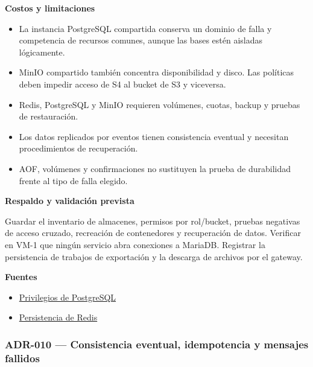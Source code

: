 \par\medskip\noindent\textbf{Costos y limitaciones}\par\nobreak\smallskip

\begin{itemize}[leftmargin=1.5em,itemsep=3pt]
\item La instancia PostgreSQL compartida conserva un dominio de falla y competencia de recursos comunes, aunque las bases estén aisladas lógicamente.
\item MinIO compartido también concentra disponibilidad y disco. Las políticas deben impedir acceso de S4 al bucket de S3 y viceversa.
\item Redis, PostgreSQL y MinIO requieren volúmenes, cuotas, backup y pruebas de restauración.
\item Los datos replicados por eventos tienen consistencia eventual y necesitan procedimientos de recuperación.
\item AOF, volúmenes y confirmaciones no sustituyen la prueba de durabilidad frente al tipo de falla elegido.
\end{itemize}

\par\medskip\noindent\textbf{Respaldo y validación prevista}\par\nobreak\smallskip

Guardar el inventario de almacenes, permisos por rol/bucket, pruebas negativas de acceso cruzado, recreación de contenedores y recuperación de datos. Verificar en VM-1 que ningún servicio abra conexiones a MariaDB. Registrar la persistencia de trabajos de exportación y la descarga de archivos por el gateway.

\par\medskip\noindent\textbf{Fuentes}\par\nobreak\smallskip

\begin{itemize}[leftmargin=1.5em,itemsep=3pt]
\item \href{https://www.postgresql.org/docs/current/ddl-priv.html}{Privilegios de PostgreSQL}
\item \href{https://redis.io/docs/latest/operate/oss_and_stack/management/persistence/}{Persistencia de Redis}
\end{itemize}

\clearpage
\subsubsection{ADR-010 — Consistencia eventual, idempotencia y mensajes fallidos}
\label{adr:010}


